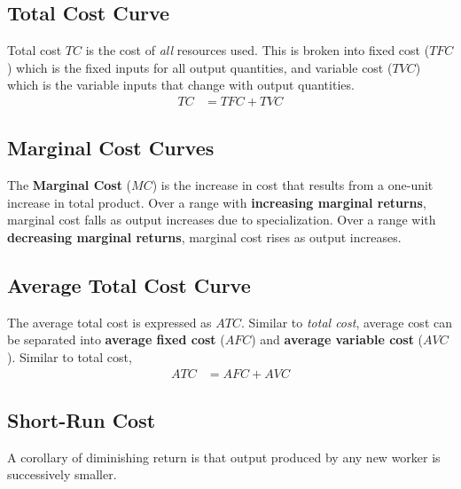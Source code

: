                 \subsection{Total Cost Curve} %
                \label{sub:total_cost_curve}
                    Total cost $TC$ is the cost of \textit{all} resources used.
                    This is broken into fixed cost ($TFC$) which is the fixed inputs for all output quantities, and variable cost ($TVC$) which is the variable inputs that change with output quantities.
                    \begin{align*}
                        TC &= TFC + TVC
                    \end{align*}
                \subsection{Marginal Cost Curves} %
                \label{sub:marginal_cost_curves}
                    The \textbf{Marginal Cost} ($MC$) is the increase in cost that results from a one-unit increase in total product.
                    Over a range with \textbf{increasing marginal returns}, marginal cost falls as output increases due to specialization.
                    Over a range with \textbf{decreasing marginal returns}, marginal cost rises as output increases.
                \subsection{Average Total Cost Curve} %
                \label{sub:average_cost_curve}
                    The average total cost is expressed as $ATC$.
                    Similar to \textit{total cost}, average cost can be separated into \textbf{average fixed cost} ($AFC$) and \textbf{average variable cost} ($AVC$).
                    Similar to total cost,
                    \begin{align*}
                        ATC &= AFC + AVC
                    \end{align*}
                \subsection{Short-Run Cost} %
                \label{sub:short_run_cost}
                    A corollary of diminishing return is that output produced by any new worker is successively smaller.
